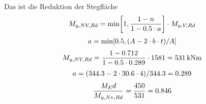 \documentclass[graybox,envcountchap,sectrefs]{svmono}
\begin{document}
Das ist die Reduktion der Stegfl\"{a}che\\

\begin{align}
M_{y,NV,Rd} = \text{min}\bigg[1, \frac{ 1 - n}{1 - 0.5 \cdot a} \bigg] \cdot M_{y,V,Rd}\nonumber
\end{align}
\begin{align}
a = \text{min} [0.5, (A - 2 \cdot b \cdot t)/A] \nonumber
\end{align}
\begin{align}
M_{y,NV,Rd} = \frac{ 1 - 0.712}{1 - 0.5 \cdot 0.289} \cdot 1581 = 531\,\text{kNm}\nonumber
\end{align}
\begin{align}
a = (344.3 - 2 \cdot 30.6 \cdot 4) /344.3 = 0.289\nonumber
\end{align}
\begin{align}
\frac{M_Ed}{M_{y,Nv,Rd}} = \frac{450}{531} = 0.846 \nonumber
\end{align}
\end{document}
